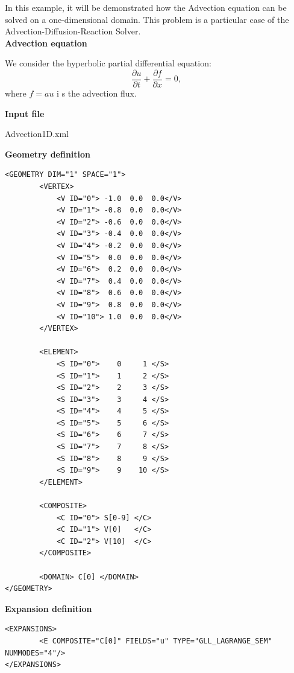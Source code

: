 In this example, it will be demonstrated how the Advection equation can be solved on a one-dimensional domain.
This problem is a particular case of the Advection-Diffusion-Reaction Solver. \\

\textbf{Advection equation}

We consider the hyperbolic partial differential equation:
\begin{equation}
\dfrac{\partial u}{\partial t} + \dfrac{\partial f}{\partial x} = 0,
\end{equation}
where $f =  a u$ i s the advection flux.

\textbf{Input file}

Advection1D.xml

\textbf{\footnotesize{Geometry definition}}

\begin{lstlisting}[style=XMLStyle]
<GEOMETRY DIM="1" SPACE="1">
        <VERTEX>
            <V ID="0"> -1.0  0.0  0.0</V>
            <V ID="1"> -0.8  0.0  0.0</V>
            <V ID="2"> -0.6  0.0  0.0</V>
            <V ID="3"> -0.4  0.0  0.0</V>
            <V ID="4"> -0.2  0.0  0.0</V>
            <V ID="5">  0.0  0.0  0.0</V>
            <V ID="6">  0.2  0.0  0.0</V>
            <V ID="7">  0.4  0.0  0.0</V>
            <V ID="8">  0.6  0.0  0.0</V>
            <V ID="9">  0.8  0.0  0.0</V>
            <V ID="10"> 1.0  0.0  0.0</V>
        </VERTEX> 
        
        <ELEMENT>
            <S ID="0">    0     1 </S>
            <S ID="1">    1     2 </S>
            <S ID="2">    2     3 </S>
            <S ID="3">    3     4 </S>
            <S ID="4">    4     5 </S>
            <S ID="5">    5     6 </S>
            <S ID="6">    6     7 </S>
            <S ID="7">    7     8 </S>
            <S ID="8">    8     9 </S>
            <S ID="9">    9    10 </S>
        </ELEMENT>
        
        <COMPOSITE>
            <C ID="0"> S[0-9] </C>
            <C ID="1"> V[0]   </C>
            <C ID="2"> V[10]  </C>
        </COMPOSITE>
        
        <DOMAIN> C[0] </DOMAIN>
</GEOMETRY>
\end{lstlisting}

\textbf{\footnotesize{Expansion definition}}

\begin{lstlisting}[style=XMLStyle]
<EXPANSIONS>
        <E COMPOSITE="C[0]" FIELDS="u" TYPE="GLL_LAGRANGE_SEM" NUMMODES="4"/>
</EXPANSIONS>
\end{lstlisting}

